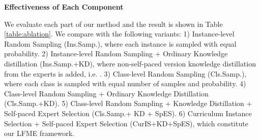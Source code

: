 \documentclass[runningheads]{llncs}
\begin{document}
	
	
	\noindent\textbf{Effectiveness of Each Component} \quad
	
	
	We evaluate each part of our method and the result is shown in Table \ref{table:ablation}. We compare with the following variants: 1) Instance-level Random Sampling (Ins.Samp.), where each instance is sampled with equal probability. 2)  Instance-level Random Sampling + Ordinary Knowledge distillation (Ins.Samp.+KD), where non-self-paced version knowledge distillation from the experts is added, i.e. . 3) Class-level Random Sampling (Cls.Samp.), where each class is sampled with equal number of samples and probability. 4) Class-level Random Sampling + Ordinary Knowledge Distillation (Cls.Samp.+KD). 5) Class-level Random Sampling + Knowledge Distillation + Self-paced Expert Selection (Cls.Samp.+ KD + SpES). 6) Curriculum Instance Selection + Self-paced Expert Selection (CurIS+KD+SpES), which constitute our LFME framework. 
	
\end{document}

